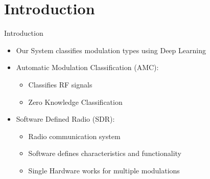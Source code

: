 
\section{Introduction}
\begin{frame}{Introduction}
    \begin{itemize}
        \item Our System classifies modulation types using Deep Learning \vfill
        \item Automatic Modulation Classification (AMC): \vfill
        \begin{itemize}
            \item Classifies RF signals \vfill
            \item Zero Knowledge Classification \vfill
        \end{itemize}
        \item Software Defined Radio (SDR): \vfill
        \begin{itemize}
            \item Radio communication system \vfill
            \item Software defines characteristics and functionality \vfill
            \item Single Hardware works for multiple modulations \vfill
        \end{itemize}
    \end{itemize}
\end{frame}